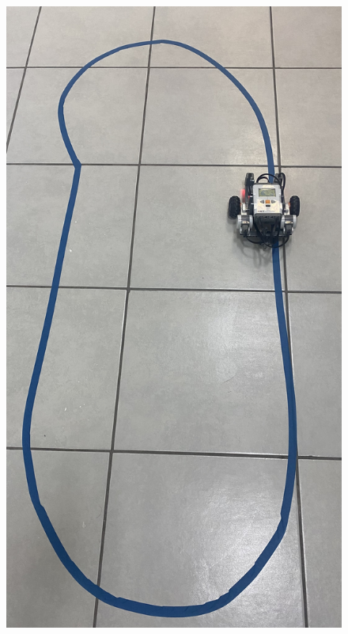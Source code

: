 \documentclass[oneside,twocolumn]{article}
\begin{document}
\begin{figure}[!hb]
  \centering
  \includegraphics[angle=90,scale=0.2]{graficos/path_robot.png}
\end{figure}
\end{document}
